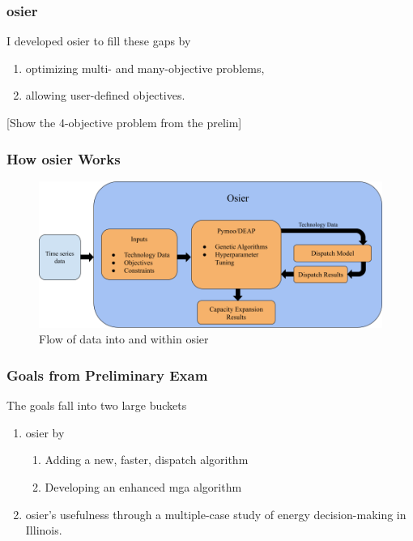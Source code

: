 \begin{frame}
    \frametitle{\gls{osier}}
    I developed \gls{osier} to fill these gaps by \cite{dotson_osier_2024}
    \begin{enumerate}
        \item optimizing multi- and many-objective problems,
        \item allowing user-defined objectives.
    \end{enumerate}
    [Show the 4-objective problem from the prelim]
\end{frame}

\begin{frame}
    \frametitle{How \gls{osier} Works}

    \begin{figure}
        \centering
        \includegraphics[width=\columnwidth]{../docs/figures/03_osier_chapter/osier_flow.png}
        \caption{Flow of data into and within \gls{osier}}
        \label{fig:osier-flow}
    \end{figure}

\end{frame}

\begin{frame}
    \frametitle{Goals from Preliminary Exam}

    The goals fall into two large buckets

    \begin{enumerate}
        \item {} \gls{osier} by
        \begin{enumerate}
            \item Adding a new, faster, dispatch algorithm
            \item Developing an enhanced \gls{mga} algorithm
        \end{enumerate}
        \item {} \gls{osier}'s usefulness through a 
        multiple-case study of energy decision-making in Illinois.
    \end{enumerate}
\end{frame}

